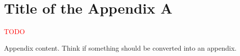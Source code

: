 \chapter{Title of the Appendix A}
\label{Appendix:Key1}

\textcolor{red}{TODO}

Appendix content. Think if something should be converted into an appendix.
